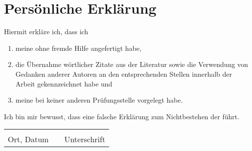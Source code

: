 \section*{Persönliche Erklärung}

Hiermit erkläre ich, dass ich
\begin{enumerate}
  \item meine \varArbeit \space ohne fremde Hilfe angefertigt habe,
  \item die Übernahme wörtlicher Zitate aus der Literatur sowie die Verwendung von Gedanken anderer Autoren an den entsprechenden Stellen innerhalb der Arbeit gekennzeichnet habe und
  \item meine \varArbeit \space bei keiner anderen Prüfungsstelle vorgelegt habe.
\end{enumerate}
Ich bin mir bewusst, dass eine falsche Erklärung zum Nichtbestehen der \varArbeit \space führt.

\vspace{2cm}

\begin{tabular}{lp{2em}l}
 \hspace{5cm}   && \hspace{3cm} \\\cline{1-1}\cline{3-3}
 Ort, Datum     && Unterschrift
\end{tabular}
